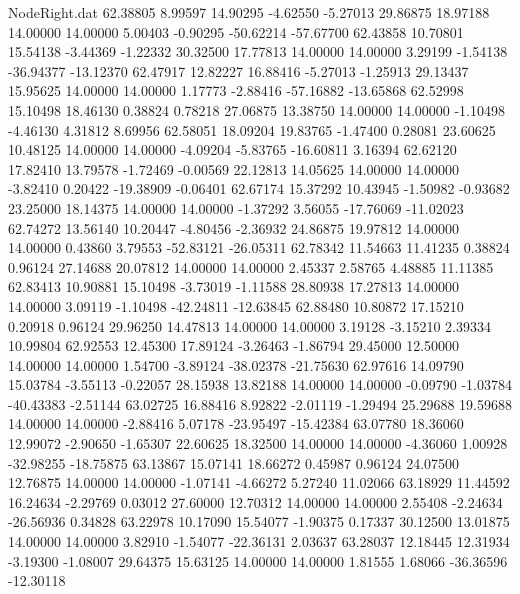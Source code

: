 \begin{filecontents}{NodeRight.dat}
  62.38805    8.99597   14.90295    -4.62550   -5.27013   29.86875   18.97188   14.00000   14.00000    5.00403   -0.90295  -50.62214  -57.67700
  62.43858   10.70801   15.54138    -3.44369   -1.22332   30.32500   17.77813   14.00000   14.00000    3.29199   -1.54138  -36.94377  -13.12370
  62.47917   12.82227   16.88416    -5.27013   -1.25913   29.13437   15.95625   14.00000   14.00000    1.17773   -2.88416  -57.16882  -13.65868
  62.52998   15.10498   18.46130     0.38824    0.78218   27.06875   13.38750   14.00000   14.00000   -1.10498   -4.46130    4.31812    8.69956
  62.58051   18.09204   19.83765    -1.47400    0.28081   23.60625   10.48125   14.00000   14.00000   -4.09204   -5.83765  -16.60811    3.16394
  62.62120   17.82410   13.79578    -1.72469   -0.00569   22.12813   14.05625   14.00000   14.00000   -3.82410    0.20422  -19.38909   -0.06401
  62.67174   15.37292   10.43945    -1.50982   -0.93682   23.25000   18.14375   14.00000   14.00000   -1.37292    3.56055  -17.76069  -11.02023
  62.74272   13.56140   10.20447    -4.80456   -2.36932   24.86875   19.97812   14.00000   14.00000    0.43860    3.79553  -52.83121  -26.05311
  62.78342   11.54663   11.41235     0.38824    0.96124   27.14688   20.07812   14.00000   14.00000    2.45337    2.58765    4.48885   11.11385
  62.83413   10.90881   15.10498    -3.73019   -1.11588   28.80938   17.27813   14.00000   14.00000    3.09119   -1.10498  -42.24811  -12.63845
  62.88480   10.80872   17.15210     0.20918    0.96124   29.96250   14.47813   14.00000   14.00000    3.19128   -3.15210    2.39334   10.99804
  62.92553   12.45300   17.89124    -3.26463   -1.86794   29.45000   12.50000   14.00000   14.00000    1.54700   -3.89124  -38.02378  -21.75630
  62.97616   14.09790   15.03784    -3.55113   -0.22057   28.15938   13.82188   14.00000   14.00000   -0.09790   -1.03784  -40.43383   -2.51144
  63.02725   16.88416    8.92822    -2.01119   -1.29494   25.29688   19.59688   14.00000   14.00000   -2.88416    5.07178  -23.95497  -15.42384
  63.07780   18.36060   12.99072    -2.90650   -1.65307   22.60625   18.32500   14.00000   14.00000   -4.36060    1.00928  -32.98255  -18.75875
  63.13867   15.07141   18.66272     0.45987    0.96124   24.07500   12.76875   14.00000   14.00000   -1.07141   -4.66272    5.27240   11.02066
  63.18929   11.44592   16.24634    -2.29769    0.03012   27.60000   12.70312   14.00000   14.00000    2.55408   -2.24634  -26.56936    0.34828
  63.22978   10.17090   15.54077    -1.90375    0.17337   30.12500   13.01875   14.00000   14.00000    3.82910   -1.54077  -22.36131    2.03637
  63.28037   12.18445   12.31934    -3.19300   -1.08007   29.64375   15.63125   14.00000   14.00000    1.81555    1.68066  -36.36596  -12.30118

\end{filecontents}
